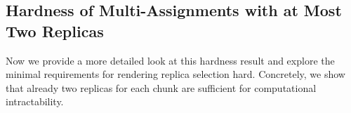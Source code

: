 \subsection{Hardness of Multi-Assignments with at Most Two Replicas}

Now we provide a more detailed look at this hardness result
and explore the minimal requirements for rendering replica selection hard.
Concretely, we show that already two replicas for each chunk are sufficient for computational intractability.

%
%
%
